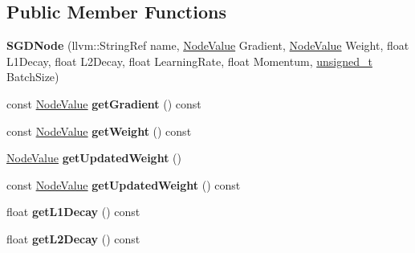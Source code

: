 \subsection*{Public Member Functions}
\begin{DoxyCompactItemize}
\item 
\mbox{\label{classglow_1_1_s_g_d_node_ac3c09a68b02a34452b415f160c753ea7}} 
{\bfseries S\+G\+D\+Node} (llvm\+::\+String\+Ref name, \hyperlink{structglow_1_1_node_value}{Node\+Value} Gradient, \hyperlink{structglow_1_1_node_value}{Node\+Value} Weight, float L1\+Decay, float L2\+Decay, float Learning\+Rate, float Momentum, \hyperlink{namespaceglow_a0ca574644e1e42ef193a9947fb4d8911}{unsigned\+\_\+t} Batch\+Size)
\item 
\mbox{\label{classglow_1_1_s_g_d_node_abdf3dceed5d666f24013adcf5465233f}} 
const \hyperlink{structglow_1_1_node_value}{Node\+Value} {\bfseries get\+Gradient} () const
\item 
\mbox{\label{classglow_1_1_s_g_d_node_a7f0c1dc5646c9585f56daa51b81f65f8}} 
const \hyperlink{structglow_1_1_node_value}{Node\+Value} {\bfseries get\+Weight} () const
\item 
\mbox{\label{classglow_1_1_s_g_d_node_a38bbac358cfd1ee38f08ef0984b21780}} 
\hyperlink{structglow_1_1_node_value}{Node\+Value} {\bfseries get\+Updated\+Weight} ()
\item 
\mbox{\label{classglow_1_1_s_g_d_node_a5311a6d805fb0da879ba88c60364f9c2}} 
const \hyperlink{structglow_1_1_node_value}{Node\+Value} {\bfseries get\+Updated\+Weight} () const
\item 
\mbox{\label{classglow_1_1_s_g_d_node_ad376c63e21f5823f671e7979a9e5b98b}} 
float {\bfseries get\+L1\+Decay} () const
\item 
\mbox{\label{classglow_1_1_s_g_d_node_ac52647514b04eb89d2854e410874e533}} 
float {\bfseries get\+L2\+Decay} () const
\item 
\mbox{\label{classglow_1_1_s_g_d_node_a0d42e98047547f08994a6b9c2ec25b0a}} 

\end{DoxyCompactItemize}
